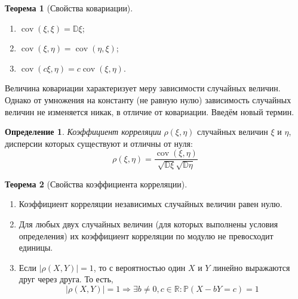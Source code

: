 \documentclass[oneside,final,14pt]{extreport}
\theoremstyle{plain}
\theoremstyle{definition}
\newtheorem*{defn}{Определение}
\theoremstyle{named}
\newtheorem*{namedthm}{Теорема}
\begin{document}
\begin{namedthm}[Свойства ковариации]\leavevmode
    \begin{enumerate}
        \item $\operatorname{cov}(\xi, \xi)=\mathbb{D} \xi$;
        \item $\operatorname{cov}(\xi, \eta)=\operatorname{cov}(\eta, \xi)$;
        \item $\operatorname{cov}(c \xi, \eta)=c \operatorname{cov}(\xi, \eta)$.
    \end{enumerate}
\end{namedthm}

Величина ковариации характеризует меру зависимости случайных величин. Однако от умножения на константу (не равную нулю) зависимость случайных величин не изменяется никак, в отличие от ковариации. Введём новый термин.

\begin{defn}
    {\it Коэффициент корреляции} $\rho(\xi,\eta)$ случайных величин $\xi$ и $\eta$, дисперсии которых существуют и отличны от нуля:
    \begin{equation*}
        \rho(\xi, \eta)=\frac{\operatorname{cov}(\xi, \eta)}{\sqrt{\mathbb{D} \xi} \sqrt{\mathbb{D} \eta}}
    \end{equation*}
\end{defn}

\begin{namedthm}[Свойства коэффициента корреляции]\leavevmode
    \begin{enumerate}
        \item Коэффициент корреляции независимых случайных величин равен нулю.
        \item Для любых двух случайных величин (для которых выполнены условия определения) их коэффициент корреляции по модулю не превосходит единицы.
        \item Если $|\rho(X,Y)| = 1$, то с вероятностью один $X$ и $Y$ линейно выражаются друг через друга. То есть,
        \begin{equation*}
            |\rho(X, Y)|=1 \Longrightarrow \exists b \neq 0, c \in \mathbb{R}: \mathbb{P}(X-b Y=c)=1
        \end{equation*}
    \end{enumerate}
\end{namedthm}
\end{document}
